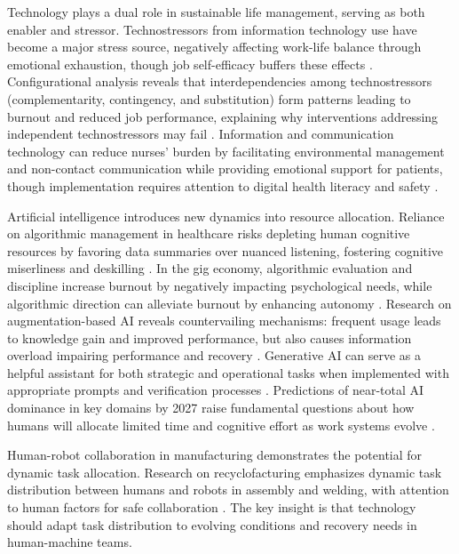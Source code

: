 Technology plays a dual role in sustainable life management, serving as both enabler and stressor. Technostressors from information technology use have become a major stress source, negatively affecting work-life balance through emotional exhaustion, though job self-efficacy buffers these effects \citep{ma_impact_2021}. Configurational analysis reveals that interdependencies among technostressors (complementarity, contingency, and substitution) form patterns leading to burnout and reduced job performance, explaining why interventions addressing independent technostressors may fail \citep{pflügner_deconstructing_2024}. Information and communication technology can reduce nurses' burden by facilitating environmental management and non-contact communication while providing emotional support for patients, though implementation requires attention to digital health literacy and safety \citep{yoo_critical_2022}.

Artificial intelligence introduces new dynamics into resource allocation. Reliance on algorithmic management in healthcare risks depleting human cognitive resources by favoring data summaries over nuanced listening, fostering cognitive miserliness and deskilling \citep{Reinhart2025}. In the gig economy, algorithmic evaluation and discipline increase burnout by negatively impacting psychological needs, while algorithmic direction can alleviate burnout by enhancing autonomy \citep{peng_every_2025}. Research on augmentation-based AI reveals countervailing mechanisms: frequent usage leads to knowledge gain and improved performance, but also causes information overload impairing performance and recovery \citep{shao_using_2024}. Generative AI can serve as a helpful assistant for both strategic and operational tasks when implemented with appropriate prompts and verification processes \citep{aguinis_how_2024}. Predictions of near-total AI dominance in key domains by 2027 raise fundamental questions about how humans will allocate limited time and cognitive effort as work systems evolve \citep{Douthat2025}.

Human-robot collaboration in manufacturing demonstrates the potential for dynamic task allocation. Research on recyclofacturing emphasizes dynamic task distribution between humans and robots in assembly and welding, with attention to human factors for safe collaboration \citep{SCU2025}. The key insight is that technology should adapt task distribution to evolving conditions and recovery needs in human-machine teams.



